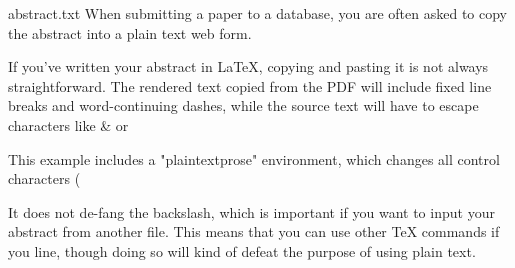 \begin{filecontents*}{abstract.txt}
When submitting a paper to a database, you are often asked to copy the abstract into a plain text web form.

If you've written your abstract in LaTeX, copying and pasting it is not always straightforward. The rendered text copied from the PDF will include fixed line breaks and word-continuing dashes, while the source text will have to escape characters like & or %

This example includes a "plaintextprose" environment, which changes all control characters (%

It does not de-fang the backslash, which is important if you want to input your abstract from another file. This means that you can use other \TeX{} commands if you line, though doing so will kind of defeat the purpose of using plain text.
\end{filecontents*}

\documentclass{article}

\usepackage[strict=true]{csquotes}

%
%
%
\newenvironment{plaintextprose}
{%
    \begingroup%
        \catcode`\$=12%
        \catcode`\&=12%
        \catcode`\#=12%
        \catcode`\^=12%
        \catcode`\_=12%
        \catcode`\~=12%
        \catcode`\%=12}
{\endgroup}



    \begin{abstract}%
        \begin{plaintextprose}\end{plaintextprose}%
    \end{abstract}


